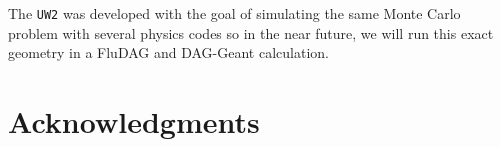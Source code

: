 \documentclass{anstrans}
\begin{document}
The \texttt{UW2} was developed with the goal of simulating the same Monte Carlo problem with several
physics codes so in the near future, we will run this exact geometry in a FluDAG and DAG-Geant calculation.

\section{Acknowledgments}



\end{document}
